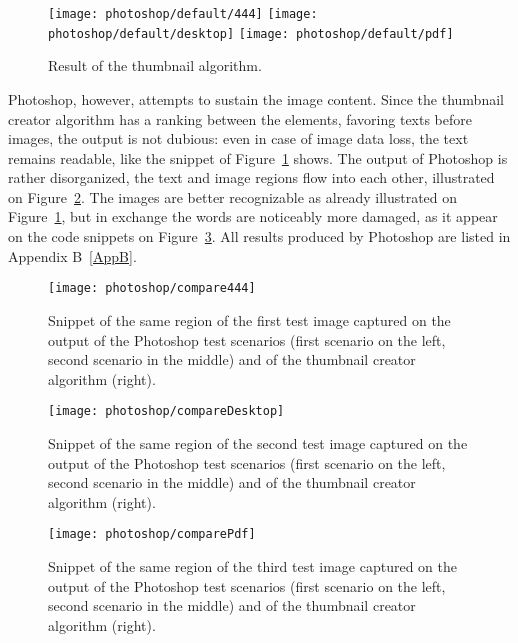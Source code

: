 \documentclass[draft,final]{vutinfth} %
\begin{document}
	\begin{figure}[H]
		\texttt{[image: photoshop/default/444]}\hfill
		\texttt{[image: photoshop/default/desktop]}\hfill
		\texttt{[image: photoshop/default/pdf]}
		\caption{Result of the thumbnail algorithm.}
	\end{figure}
	Photoshop, however, attempts to sustain the image content.
	Since the thumbnail creator algorithm has a ranking between the elements, favoring texts before images, the output is not dubious: even in case of image data loss, the text remains readable, like the snippet of Figure~\ref{fig:comp444} shows.
	The output of Photoshop is rather disorganized, the text and image regions flow into each other, illustrated on Figure~\ref{fig:compDesktop}.
	The images are better recognizable as already illustrated on Figure~\ref{fig:comp444}, but in exchange the words are noticeably more damaged, as it appear on the code snippets on Figure~\ref{fig:comppdf}. 
	All results produced by Photoshop are listed in Appendix B~\ref{AppB}. 
	
	\begin{figure}[H]
		\centering		
		\texttt{[image: photoshop/compare444]}
		\caption{Snippet of the same region of the first test image captured on the output of the Photoshop test scenarios (first scenario on the left, second scenario in the middle) and of the thumbnail creator algorithm (right). }
		\label{fig:comp444}
	\end{figure}
	\begin{figure}[H]
		\centering		
		\texttt{[image: photoshop/compareDesktop]}
		\caption{Snippet of the same region of the second test image captured on the output of the Photoshop test scenarios (first scenario on the left, second scenario in the middle) and of the thumbnail creator algorithm (right).}
		\label{fig:compDesktop}
	\end{figure}
	\begin{figure}[H]
		\centering		
		\texttt{[image: photoshop/comparePdf]}
		\caption{Snippet of the same region of the third test image captured on the output of the Photoshop test scenarios (first scenario on the left, second scenario in the middle) and of the thumbnail creator algorithm (right).}
		\label{fig:comppdf}
	\end{figure}
	
\end{document}
